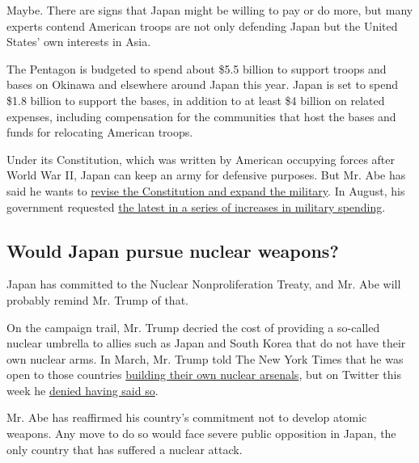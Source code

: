 Maybe. There are signs that Japan might be willing to pay or do more,
but many experts contend American troops are not only defending Japan
but the United States' own interests in Asia.

The Pentagon is budgeted to spend about \$5.5 billion to support troops
and bases on Okinawa and elsewhere around Japan this year. Japan is set
to spend \$1.8 billion to support the bases, in addition to at least \$4
billion on related expenses, including compensation for the communities
that host the bases and funds for relocating American troops.

Under its Constitution, which was written by American occupying forces
after World War II, Japan can keep an army for defensive purposes. But
Mr. Abe has said he wants to
\href{http://www.nytimes.com/2016/07/12/world/asia/japan-election-shinzo-abe.html?rref=collection\%2Fbyline\%2Fmotoko-rich\&action=click\&contentCollection=undefined\&region=stream\&module=stream_unit\&version=latest\&contentPlacement=31\&pgtype=collection}{revise
the Constitution and expand the military}. In August, his government
requested
\href{http://www.nytimes.com/2016/08/31/world/asia/japan-defense-military-budget-shinzo-abe.html?rref=collection\%2Fbyline\%2Fmotoko-rich\&action=click\&contentCollection=undefined\&region=stream\&module=stream_unit\&version=latest\&contentPlacement=20\&pgtype=collection}{the
latest in a series of increases in military spending}.

\hypertarget{would-japan-pursue-nuclear-weapons}{%
\subsection{Would Japan pursue nuclear
weapons?}\label{would-japan-pursue-nuclear-weapons}}

Japan has committed to the Nuclear Nonproliferation Treaty, and Mr. Abe
will probably remind Mr. Trump of that.

On the campaign trail, Mr. Trump decried the cost of providing a
so-called nuclear umbrella to allies such as Japan and South Korea that
do not have their own nuclear arms. In March, Mr. Trump told The New
York Times that he was open to those countries
\href{http://www.nytimes.com/2016/03/27/us/politics/donald-trump-foreign-policy.html}{building
their own nuclear arsenals}, but on Twitter this week he
\href{https://twitter.com/realDonaldTrump/status/797832229800050688}{denied
having said so}.

Mr. Abe has reaffirmed his country's commitment not to develop atomic
weapons. Any move to do so would face severe public opposition in Japan,
the only country that has suffered a nuclear attack.

